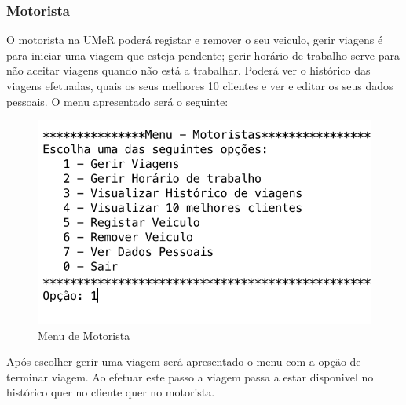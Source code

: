 \subsubsection{Motorista}
O motorista na UMeR poderá registar e remover o seu veiculo, gerir viagens é para iniciar uma viagem que esteja pendente; gerir horário de trabalho serve para não aceitar viagens quando não está a trabalhar. Poderá ver o histórico das viagens efetuadas, quais os seus melhores 10 clientes e ver e editar os seus dados pessoais. O menu apresentado será o seguinte: 
\begin{figure}[htpb]
	\centering
	\includegraphics[scale=0.6]{imagem/menuMotorista}
	\caption{Menu de Motorista }
	\label{p3:fig:p3_menuMotorista}
\end{figure}

Após escolher gerir uma viagem será apresentado o menu com a opção de terminar viagem. Ao efetuar este passo a viagem passa a estar disponivel no histórico quer no cliente quer no motorista. 

